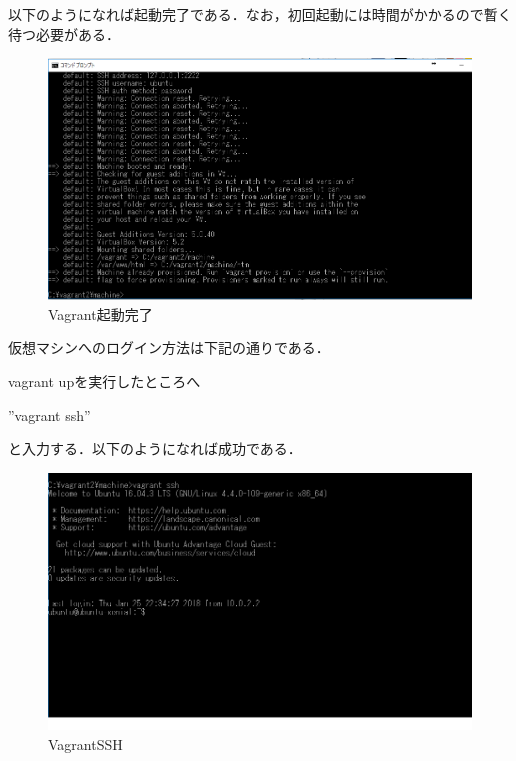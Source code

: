 以下のようになれば起動完了である．なお，初回起動には時間がかかるので暫く待つ必要がある．
\begin{figure}[htb]
\centering
\includegraphics[width=13cm]{4-13.png}
\caption{Vagrant起動完了}\label{4-13}
\end{figure}
\newpage

仮想マシンへのログイン方法は下記の通りである．

vagrant upを実行したところへ

”vagrant ssh”

と入力する．以下のようになれば成功である．
\begin{figure}[htb]
\centering
\includegraphics[width=13cm]{4-14.png}
\caption{VagrantSSH}\label{4-14}
\end{figure}
\newpage

